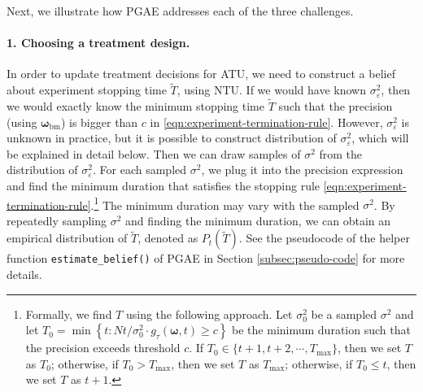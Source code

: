 	

Next, we illustrate how PGAE addresses each of the three challenges.

\paragraph{1. Choosing a treatment design.}
{\blue 
In order to update treatment decisions for ATU, we need to construct a belief about experiment stopping time $\tilde{T}$, using NTU. If we would have known $\sigma_\varepsilon^2$, then we would exactly know the minimum stopping time $\tilde{T}$ such that the precision (using $\bm{\omega}_{\mathrm{bm}}$) is bigger than $c$ in \eqref{eqn:experiment-termination-rule}. However, $\sigma_\varepsilon^2$ is unknown in practice, but it is possible to construct  distribution of $\sigma_\varepsilon^2$, which will be explained in detail below. Then we can draw samples of $\sigma^2$ from the  distribution of $\sigma_\varepsilon^2$. For each sampled  $\sigma^2$, we plug it into the precision expression and find the minimum duration that satisfies the stopping rule \eqref{eqn:experiment-termination-rule}.\footnote{Formally, we find $T$ using the following approach. Let $\sigma_0^2$ be a sampled $\sigma^2$ and let $T_0 = \min \left\{t: Nt / \sigma_0^2 \cdot g_\tau(\bm{\omega}, t) \geq c  \right\}$ be the minimum duration such that the precision exceeds threshold $c$. If $T_0 \in \{t+1, t+2, \cdots, T_{\max}\}$, then we set $T$ as $ T_0$; otherwise, if $T_0 > T_{\max}$, then we set $T$ as $T_{\max}$; otherwise, if $T_0 \leq t$, then we set $T$ as $t+1$. } The minimum duration may vary with the sampled $\sigma^2$. By repeatedly sampling $\sigma^2$ and finding the minimum duration, we can obtain an empirical distribution of $\tilde{T}$, denoted as $P_t(\tilde{T})$. See the pseudocode of the helper function \texttt{estimate\_belief()} of PGAE in Section \ref{subsec:pseudo-code} for more details.

}
